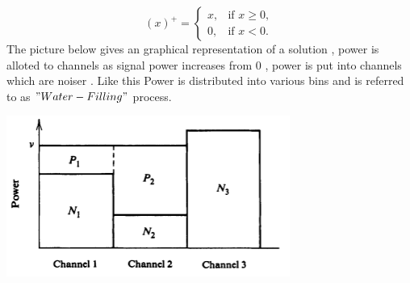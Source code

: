 \[
(x)^+ = 
\begin{cases}
x, & \text{if } x \geq 0, \\
0, & \text{if } x < 0.
\end{cases}
\]
%
The picture below gives an graphical representation of a solution , power is alloted to channels as signal power increases from 0 , power is put into channels which are noiser . Like this Power is distributed into various bins and is referred to as $"Water-Filling"$ process.
\begin{center}
	\includegraphics[scale=0.5]{Diagrams/parallel_guassian_channels_solution.png}
\end{center} 
